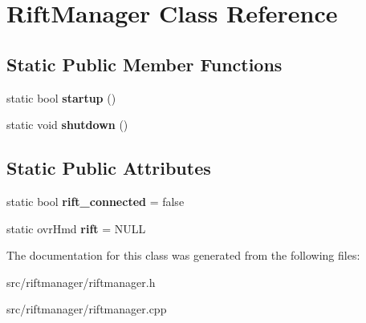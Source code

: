 \hypertarget{class_rift_manager}{}\section{Rift\+Manager Class Reference}
\label{class_rift_manager}
\subsection*{Static Public Member Functions}
\begin{DoxyCompactItemize}
\item 
\hypertarget{class_rift_manager_aabc01da9f5454289e95b3d277761ef06}{}static bool {\bfseries startup} ()\label{class_rift_manager_aabc01da9f5454289e95b3d277761ef06}

\item 
\hypertarget{class_rift_manager_ad814b5e58d1a4a8acb0f5c907d6504c4}{}static void {\bfseries shutdown} ()\label{class_rift_manager_ad814b5e58d1a4a8acb0f5c907d6504c4}

\end{DoxyCompactItemize}
\subsection*{Static Public Attributes}
\begin{DoxyCompactItemize}
\item 
\hypertarget{class_rift_manager_a33b8315d61707a64badb8d5c4d23fa2c}{}static bool {\bfseries rift\+\_\+connected} = false\label{class_rift_manager_a33b8315d61707a64badb8d5c4d23fa2c}

\item 
\hypertarget{class_rift_manager_a50187bd5e05063e09f3659400ebb4959}{}static ovr\+Hmd {\bfseries rift} = N\+U\+L\+L\label{class_rift_manager_a50187bd5e05063e09f3659400ebb4959}

\end{DoxyCompactItemize}


The documentation for this class was generated from the following files\+:\begin{DoxyCompactItemize}
\item 
src/riftmanager/riftmanager.\+h\item 
src/riftmanager/riftmanager.\+cpp\end{DoxyCompactItemize}
